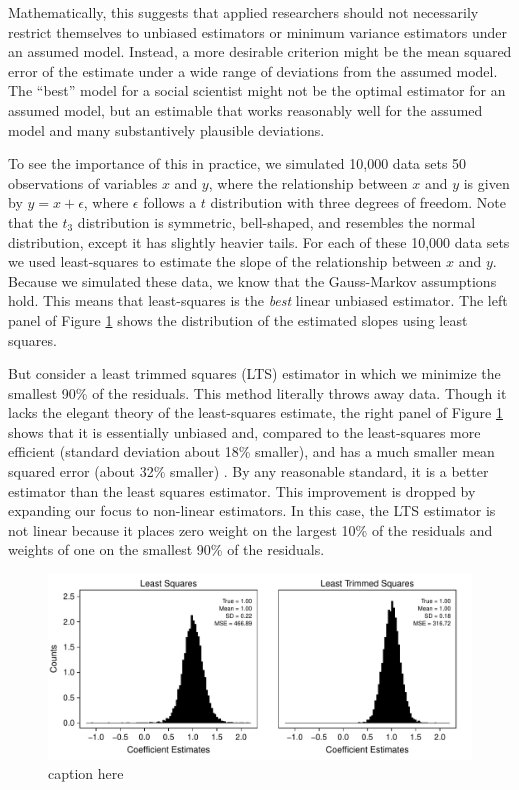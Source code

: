 \documentclass[12pt]{article}
\begin{document}
Mathematically, this suggests that applied researchers should not necessarily restrict themselves to unbiased estimators or minimum variance estimators under an assumed model. Instead, a more desirable criterion might be the mean squared error of the estimate under a wide range of deviations from the assumed model. The ``best'' model for a social scientist might not be the optimal estimator for an assumed model, but an estimable that works reasonably well for the assumed model and many substantively plausible deviations. 

To see the importance of this in practice, we simulated 10,000 data sets 50 observations of variables $x$ and $y$, where the relationship between $x$ and $y$ is given by $y = x + \epsilon$, where $\epsilon$ follows a $t$ distribution with three degrees of freedom. Note that the $t_3$ distribution is symmetric, bell-shaped, and resembles the normal distribution, except it has slightly heavier tails. For each of these 10,000 data sets we used least-squares to estimate the slope of the relationship between $x$ and $y$. Because we simulated these data, we know that the Gauss-Markov assumptions hold. This means that least-squares is the \textit{best} linear unbiased estimator. The left panel of Figure \ref{fig:lts-illustration} shows the distribution of the estimated slopes using least squares.

But consider a least trimmed squares (LTS) estimator in which we minimize the smallest 90\% of the residuals. This method literally throws away data. Though it lacks the elegant theory of the least-squares estimate, the right panel of Figure \ref{fig:lts-illustration} shows that it is essentially unbiased and, compared to the least-squares more efficient (standard deviation about 18\% smaller), and has a much smaller mean squared error (about 32\% smaller) . By any reasonable standard, it is a better estimator than the least squares estimator. This improvement is dropped by expanding our focus to non-linear estimators. In this case, the LTS estimator is not linear because it places zero weight on the largest 10\% of the residuals and weights of one on the smallest 90\% of the residuals.

\begin{figure}[H]
\begin{center}
\includegraphics[scale = .7]{figs/lts-illustration.pdf}
\caption{caption here}\label{fig:lts-illustration}
\end{center}
\end{figure}
\end{document}
